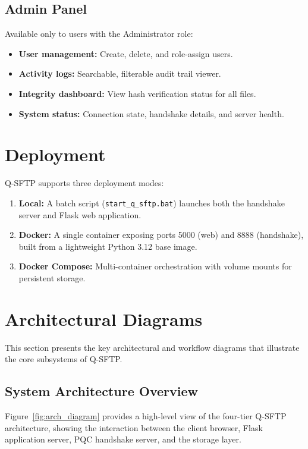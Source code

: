 \subsection{Admin Panel}

Available only to users with the Administrator role:

\begin{itemize}
    \item \textbf{User management:} Create, delete, and role-assign users.
    \item \textbf{Activity logs:} Searchable, filterable audit trail viewer.
    \item \textbf{Integrity dashboard:} View hash verification status for all files.
    \item \textbf{System status:} Connection state, handshake details, and server health.
\end{itemize}

\section{Deployment}

Q-SFTP supports three deployment modes:

\begin{enumerate}
    \item \textbf{Local:} A batch script (\texttt{start\_q\_sftp.bat}) launches both the handshake server and Flask web application.
    \item \textbf{Docker:} A single container exposing ports 5000 (web) and 8888 (handshake), built from a lightweight Python 3.12 base image.
    \item \textbf{Docker Compose:} Multi-container orchestration with volume mounts for persistent storage.
\end{enumerate}

\section{Architectural Diagrams}

This section presents the key architectural and workflow diagrams that illustrate the core subsystems of Q-SFTP.

\subsection{System Architecture Overview}

Figure~\ref{fig:arch_diagram} provides a high-level view of the four-tier Q-SFTP architecture, showing the interaction between the client browser, Flask application server, PQC handshake server, and the storage layer.


